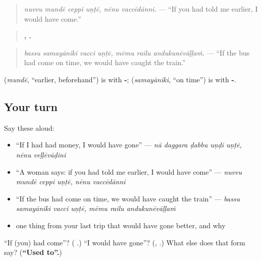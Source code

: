 \begin{quote}
\emph{nuvvu mundē ceppi uṇṭē, nēnu vaccēdānni.} — \textquotedblleft{}If you had told me earlier, I would have come.\textquotedblright{}
\end{quote}

\begin{quote}
\textbf{   ,   .}
\end{quote}

\begin{quote}
\emph{bassu samayāniki vacci uṇṭē, mēmu railu andukunēvāḷḷaṁ.} — \textquotedblleft{}If the bus had come on time, we would have caught the train.\textquotedblright{}
\end{quote}

\textbf{} (\emph{mundē}, \textquotedblleft{}earlier, beforehand\textquotedblright{}) is \textbf{} with \textbf{-}; \textbf{} (\emph{samayāniki}, \textquotedblleft{}on time\textquotedblright{}) is \textbf{} with \textbf{-}.

\subsection*{Your turn}
Say these aloud:

\begin{itemize}
\raggedright
  \item \textquotedblleft{}If I had had money, I would have gone\textquotedblright{} — \emph{nā daggara ḍabbu uṇḍi uṇṭē, nēnu veḷḷēvāḍini}
  \item \textquotedblleft{}A woman says: if you had told me earlier, I would have come\textquotedblright{} — \emph{nuvvu mundē ceppi uṇṭē, nēnu vaccēdānni}
  \item \textquotedblleft{}If the bus had come on time, we would have caught the train\textquotedblright{} — \emph{bassu samayāniki vacci uṇṭē, mēmu railu andukunēvāḷḷaṁ}
  \item one thing from your last trip that would have gone better, and why
\end{itemize}

\begin{tcolorbox}[breakable,colback=teal!4,colframe=teal!35!black,title={Before you move on}]
\textquotedblleft{}If (you) had come\textquotedblright{}? (\textbf{ }.) \textquotedblleft{}I would have gone\textquotedblright{}? (\textbf{}, \textbf{}.) What else does that form say? (\textbf{\textquotedblleft{}Used to\textquotedblright{}.})
\end{tcolorbox}
